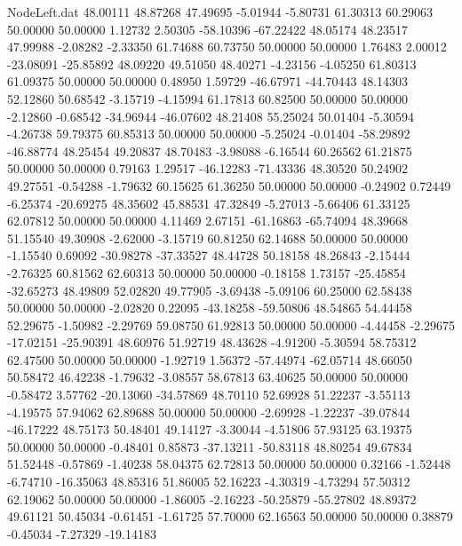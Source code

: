 \begin{filecontents}{NodeLeft.dat}
  48.00111   48.87268   47.49695    -5.01944   -5.80731   61.30313   60.29063   50.00000   50.00000    1.12732    2.50305  -58.10396  -67.22422
  48.05174   48.23517   47.99988    -2.08282   -2.33350   61.74688   60.73750   50.00000   50.00000    1.76483    2.00012  -23.08091  -25.85892
  48.09220   49.51050   48.40271    -4.23156   -4.05250   61.80313   61.09375   50.00000   50.00000    0.48950    1.59729  -46.67971  -44.70443
  48.14303   52.12860   50.68542    -3.15719   -4.15994   61.17813   60.82500   50.00000   50.00000   -2.12860   -0.68542  -34.96944  -46.07602
  48.21408   55.25024   50.01404    -5.30594   -4.26738   59.79375   60.85313   50.00000   50.00000   -5.25024   -0.01404  -58.29892  -46.88774
  48.25454   49.20837   48.70483    -3.98088   -6.16544   60.26562   61.21875   50.00000   50.00000    0.79163    1.29517  -46.12283  -71.43336
  48.30520   50.24902   49.27551    -0.54288   -1.79632   60.15625   61.36250   50.00000   50.00000   -0.24902    0.72449   -6.25374  -20.69275
  48.35602   45.88531   47.32849    -5.27013   -5.66406   61.33125   62.07812   50.00000   50.00000    4.11469    2.67151  -61.16863  -65.74094
  48.39668   51.15540   49.30908    -2.62000   -3.15719   60.81250   62.14688   50.00000   50.00000   -1.15540    0.69092  -30.98278  -37.33527
  48.44728   50.18158   48.26843    -2.15444   -2.76325   60.81562   62.60313   50.00000   50.00000   -0.18158    1.73157  -25.45854  -32.65273
  48.49809   52.02820   49.77905    -3.69438   -5.09106   60.25000   62.58438   50.00000   50.00000   -2.02820    0.22095  -43.18258  -59.50806
  48.54865   54.44458   52.29675    -1.50982   -2.29769   59.08750   61.92813   50.00000   50.00000   -4.44458   -2.29675  -17.02151  -25.90391
  48.60976   51.92719   48.43628    -4.91200   -5.30594   58.75312   62.47500   50.00000   50.00000   -1.92719    1.56372  -57.44974  -62.05714
  48.66050   50.58472   46.42238    -1.79632   -3.08557   58.67813   63.40625   50.00000   50.00000   -0.58472    3.57762  -20.13060  -34.57869
  48.70110   52.69928   51.22237    -3.55113   -4.19575   57.94062   62.89688   50.00000   50.00000   -2.69928   -1.22237  -39.07844  -46.17222
  48.75173   50.48401   49.14127    -3.30044   -4.51806   57.93125   63.19375   50.00000   50.00000   -0.48401    0.85873  -37.13211  -50.83118
  48.80254   49.67834   51.52448    -0.57869   -1.40238   58.04375   62.72813   50.00000   50.00000    0.32166   -1.52448   -6.74710  -16.35063
  48.85316   51.86005   52.16223    -4.30319   -4.73294   57.50312   62.19062   50.00000   50.00000   -1.86005   -2.16223  -50.25879  -55.27802
  48.89372   49.61121   50.45034    -0.61451   -1.61725   57.70000   62.16563   50.00000   50.00000    0.38879   -0.45034   -7.27329  -19.14183

\end{filecontents}
